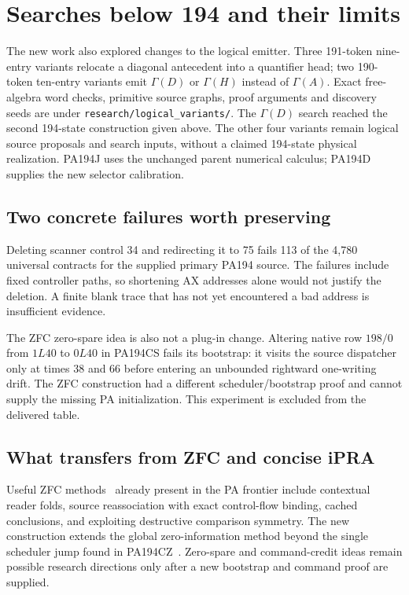 \documentclass[11pt,letterpaper]{article}
\newcommand{\file}[1]{\texttt{\nolinkurl{#1}}}
\begin{document}
\section{Searches below 194 and their limits}



The new work also explored changes to the logical emitter. Three
191-token nine-entry variants relocate a diagonal antecedent into a
quantifier head; two 190-token ten-entry variants emit \(\Gamma(D)\)
or \(\Gamma(H)\) instead of \(\Gamma(A)\). Exact free-algebra word
checks, primitive source graphs, proof arguments and discovery seeds are
under \file{research/logical_variants/}. The \(\Gamma(D)\) search reached
the second 194-state construction given above. The other four variants
remain logical source proposals and search inputs, without a claimed
194-state physical realization. PA194J uses the unchanged parent
numerical calculus; PA194D supplies the new selector calibration.

\subsection{Two concrete failures worth preserving}

Deleting scanner control 34 and redirecting it to 75 fails 113 of the
4,780 universal contracts for the supplied primary PA194 source. The failures include fixed
controller paths, so shortening AX addresses alone would not justify
the deletion. A finite blank trace that has not yet encountered a bad
address is insufficient evidence.

The ZFC zero-spare idea is also not a plug-in change. Altering native
row \(198/0\) from \(1L40\) to \(0L40\) in PA194CS fails its bootstrap:
it visits the source dispatcher only at times 38 and 66 before entering
an unbounded rightward one-writing drift. The ZFC construction had a
different scheduler/bootstrap proof and cannot supply the missing PA
initialization. This experiment is excluded from the delivered table.

\subsection{What transfers from ZFC and concise iPRA}

Useful ZFC methods~\cite{zfc} already present in the PA frontier include contextual
reader folds, source reassociation with exact control-flow binding,
cached conclusions, and exploiting destructive comparison symmetry.
The new construction extends the global zero-information method beyond
the single scheduler jump found in PA194CZ~\cite{cz}. Zero-spare and command-credit
ideas remain possible research directions only after a new bootstrap
and command proof are supplied.
\end{document}
